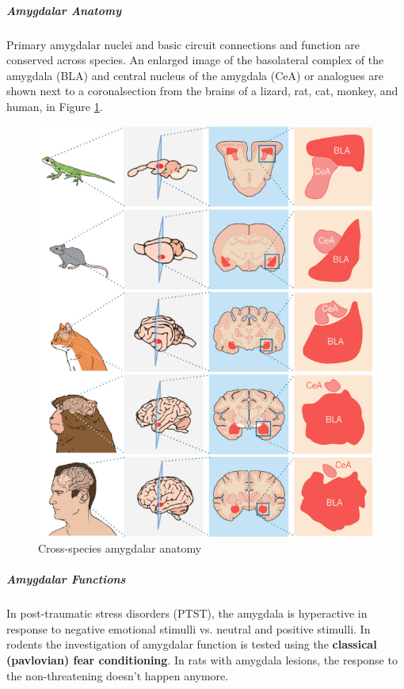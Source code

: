 \documentclass[12pt,article,oneside,a4paper]{memoir}
\begin{document}
\subparagraph{Amygdalar Anatomy} Primary amygdalar nuclei and basic circuit connections and
function are conserved across species. An enlarged image of the basolateral complex of the
amygdala (BLA) and central nucleus of the amygdala (CeA) or analogues are shown next to a coronalsection from the brains of a lizard, rat, cat, monkey, and human, in Figure \ref{fig:amygdalaAnatomy}.

\begin{figure}
	\centering
  	\includegraphics[width=\linewidth]{imgs/amygdalar-anatomy.png}
	\caption{Cross-species amygdalar anatomy}
  	\label{fig:amygdalaAnatomy}
\end{figure}

\subparagraph{Amygdalar Functions} In post-traumatic stress disorders (PTST), the amygdala is hyperactive in response to negative emotional stimulli vs. neutral and positive stimulli. In rodents the investigation of amygdalar function is tested using the \textbf{classical (pavlovian) fear conditioning}. In rats with amygdala lesions, the response to the non-threatening doesn't happen anymore.
\end{document}
